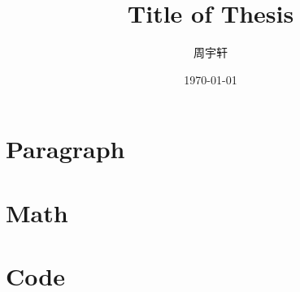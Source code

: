 \documentclass[no-math]{styles/thesis}
\title{Title of Thesis}
\author{周宇轩}
\date{\today}
\numberwithin{equation}{section}
\numberwithin{figure}{section}
\numberwithin{table}{section}
\begin{document}
\maketitle
\thispagestyle{empty}
\newpage

\tableofcontents
\thispagestyle{empty}

\newpage
\setcounter{page}{1}

\section{Paragraph}


\section{Math}


\section{Code}
\inputminted{python}{contents/code.py}

\nocite{*}
\printbibliography
\end{document}
